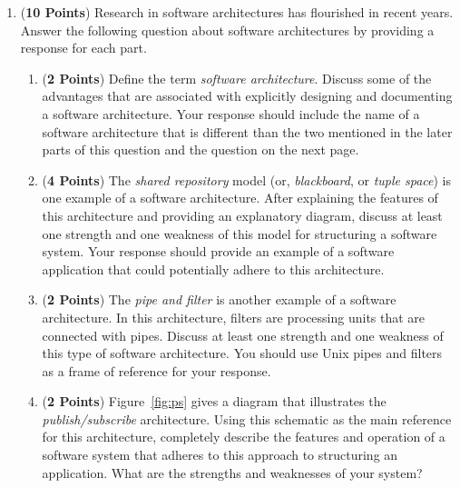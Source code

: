 \documentclass[12pt,epsf,psfig,graphics]{article}
\begin{document}
\begin{enumerate}
\newpage

\item ({\bf 10 Points}) Research in software architectures has flourished
in recent years.  Answer the following question about software architectures
by providing a response for each part.

\begin{enumerate}

\item ({\bf 2 Points}) Define the term {\em software architecture}.
  Discuss some of the advantages that are associated with explicitly
  designing and documenting a software architecture.  Your response
  should include the name of a software architecture that is different
  than the two mentioned in the later parts of this question and the
  question on the next page.

\item ({\bf 4 Points}) The {\em shared repository} model (or, {\em
  blackboard}, or {\em tuple space}) is one example of a software
  architecture.  After explaining the features of this architecture
  and providing an explanatory diagram, discuss at least one strength
  and one weakness of this model for structuring a software system.
  Your response should provide an example of a software application
  that could potentially adhere to this architecture.

\item ({\bf 2 Points}) The {\em pipe and filter} is another example of
  a software architecture.  In this architecture, filters are
  processing units that are connected with pipes.  Discuss at least
  one strength and one weakness of this type of software architecture.
  You should use Unix pipes and filters as a frame of reference for
  your response.

\item ({\bf 2 Points}) Figure~\ref{fig:ps} gives a diagram that
  illustrates the {\em publish/subscribe} architecture.  Using this
  schematic as the main reference for this architecture, completely
  describe the features and operation of a software system that
  adheres to this approach to structuring an application.  What are
  the strengths and weaknesses of your system?

\end{enumerate}


\end{enumerate}
\end{document}
